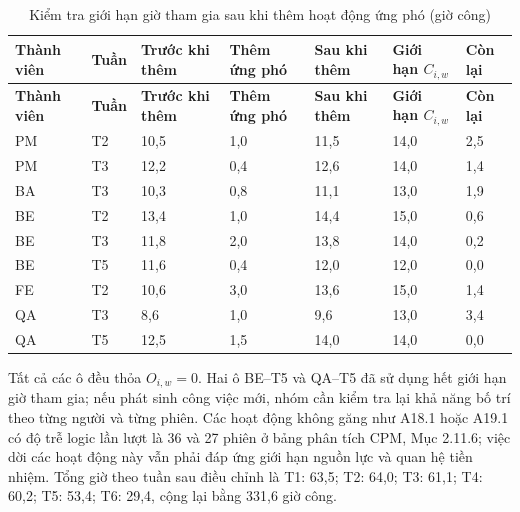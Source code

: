 {\small
\begin{longtable}{@{}Y{1.7cm}Y{1.0cm}Y{2.0cm}Y{1.9cm}Y{1.9cm}Y{2.2cm}Y{1.5cm}@{}}
\caption{Kiểm tra giới hạn giờ tham gia sau khi thêm hoạt động ứng phó (giờ công)}
\label{tab:p29-check}\\
\toprule
\textbf{Thành viên} &
\textbf{Tuần} &
\textbf{Trước khi thêm} &
\textbf{Thêm ứng phó} &
\textbf{Sau khi thêm} &
\textbf{Giới hạn $C_{i,w}$} &
\textbf{Còn lại} \\
\midrule
\endfirsthead

\toprule
\textbf{Thành viên} &
\textbf{Tuần} &
\textbf{Trước khi thêm} &
\textbf{Thêm ứng phó} &
\textbf{Sau khi thêm} &
\textbf{Giới hạn $C_{i,w}$} &
\textbf{Còn lại} \\
\midrule
\endhead

\bottomrule
\endfoot

PM & T2 & 10,5 & 1,0 & 11,5 & 14,0 & 2,5 \\

PM & T3 & 12,2 & 0,4 & 12,6 & 14,0 & 1,4 \\

BA & T3 & 10,3 & 0,8 & 11,1 & 13,0 & 1,9 \\

BE & T2 & 13,4 & 1,0 & 14,4 & 15,0 & 0,6 \\

BE & T3 & 11,8 & 2,0 & 13,8 & 14,0 & 0,2 \\

BE & T5 & 11,6 & 0,4 & 12,0 & 12,0 & 0,0 \\

FE & T2 & 10,6 & 3,0 & 13,6 & 15,0 & 1,4 \\

QA & T3 & 8,6 & 1,0 & 9,6 & 13,0 & 3,4 \\

QA & T5 & 12,5 & 1,5 & 14,0 & 14,0 & 0,0 \\

\end{longtable}
}

Tất cả các ô đều thỏa $O_{i,w} = 0$. Hai ô BE--T5 và QA--T5 đã sử dụng hết giới hạn giờ tham gia; nếu phát sinh công việc mới, nhóm cần kiểm tra lại khả năng bố trí theo từng người và từng phiên. Các hoạt động không găng như A18.1 hoặc A19.1 có độ trễ logic lần lượt là 36 và 27 phiên ở bảng phân tích CPM, Mục 2.11.6; việc dời các hoạt động này vẫn phải đáp ứng giới hạn nguồn lực và quan hệ tiền nhiệm. Tổng giờ theo tuần sau điều chỉnh là T1: 63,5; T2: 64,0; T3: 61,1; T4: 60,2; T5: 53,4; T6: 29,4, cộng lại bằng 331,6 giờ công.

